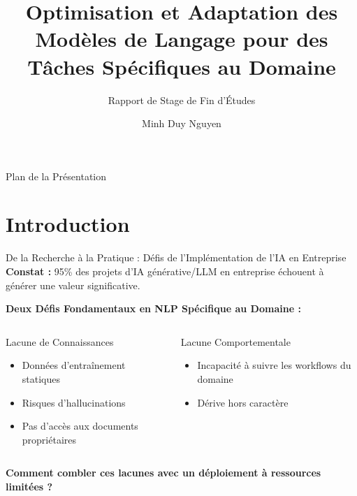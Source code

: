 \documentclass[11pt, aspectratio=169, xcolor=table]{beamer}
\title{Optimisation et Adaptation des Modèles de Langage pour des Tâches Spécifiques au Domaine}
\subtitle{Rapport de Stage de Fin d'Études}
\author{Minh Duy Nguyen}
\institute{Milad Mozafari (Torus AI) \& David Bertoin (INSA Toulouse)}
\date{}
\begin{document}
\begin{frame}[plain]
    \titlepage
\end{frame}

\begin{frame}{Plan de la Présentation}
    \tableofcontents
\end{frame}

\section{Introduction}

\begin{frame}{De la Recherche à la Pratique : Défis de l'Implémentation de l'IA en Entreprise}
    \textbf{Constat :} 95\% des projets d'IA générative/LLM en entreprise échouent à générer une valeur significative.\\
    \vspace{0.3cm}
    
    \textbf{Deux Défis Fondamentaux en NLP Spécifique au Domaine :}
    \vspace{0.2cm}
    
    \begin{columns}[T]
        \begin{alertblock}{Lacune de Connaissances}
            \begin{itemize}
                \item Données d'entraînement statiques
                \item Risques d'hallucinations
                \item Pas d'accès aux documents propriétaires
            \end{itemize}
        \end{alertblock}

        \begin{alertblock}{Lacune Comportementale}
            \begin{itemize}
                \item Incapacité à suivre les workflows du domaine
                \item Dérive hors caractère
            \end{itemize}
        \end{alertblock}
    \end{columns}

    \vspace{0.3cm}
    \begin{center}
        \textbf{\color{MainNavy} Comment combler ces lacunes avec un déploiement à ressources limitées ?}
    \end{center}
\end{frame}
\end{document}
